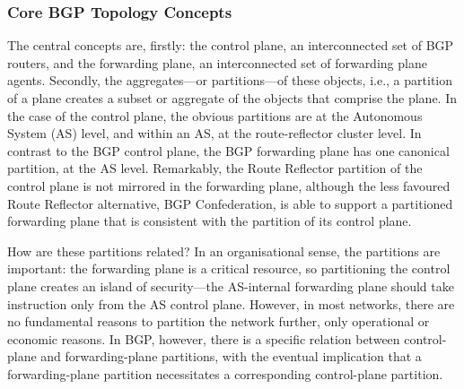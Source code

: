 

\subsubsection{Core BGP Topology Concepts}
The central concepts are, firstly: the control plane, an interconnected set of BGP routers, and the forwarding plane, an interconnected set of forwarding plane agents. Secondly, the aggregates—or partitions—of these objects, i.e., a partition of a plane creates a subset or aggregate of the objects that comprise the plane. In the case of the control plane, the obvious partitions are at the Autonomous System (AS) level, and within an AS, at the route-reflector cluster level. In contrast to the BGP control plane, the BGP forwarding plane has one canonical partition, at the AS level. Remarkably, the Route Reflector partition of the control plane is not mirrored in the forwarding plane, although the less favoured Route Reflector alternative, BGP Confederation, is able to support a partitioned forwarding plane that is consistent with the partition of its control plane.

How are these partitions related? In an organisational sense, the partitions are important: the forwarding plane is a critical resource, so partitioning the control plane creates an island of security—the AS-internal forwarding plane should take instruction only from the AS control plane. However, in most networks, there are no fundamental reasons to partition the network further, only operational or economic reasons. In BGP, however, there is a specific relation between control-plane and forwarding-plane partitions, with the eventual implication that a forwarding-plane partition necessitates a corresponding control-plane partition.

